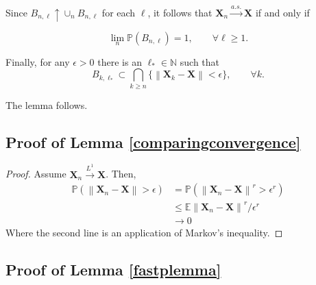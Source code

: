\documentclass[11pt] {article}
\newcommand{\norm}[1]{\left\lVert#1\right\rVert}
\newcommand{\Prob}{\mathbb{P}}
\newcommand{\X}{\pmb{X}}
\newcommand{\Expectation}{\mathbb{E}}
\newcommand{\convas}{\overset{a.s.}{\longrightarrow}}
\newcommand{\naturals}{\mathbb{N}}
\begin{document}
Since $B_{n, \ell} \uparrow \cup_nB_{n,\ell}$ for each $\ell$, it follows that $\X_n\convas\X$ if and only if

\begin{equation*}
\lim_n \Prob(B_{n,\ell}) = 1, \qquad  \forall \ell \geq 1.
\end{equation*}

Finally, for any $\epsilon > 0 $ there is an $\ell_* \in \naturals $ such that 
\begin{equation*}
B_{k,\ell_*} \subset \bigcap_{k \geq n} \{\norm{\X_k - \X}< \epsilon\}, \qquad \forall k.
\end{equation*}

The lemma follows. 

\subsection*{Proof of Lemma \ref{comparingconvergence}}
\begin{proof}
	Assume $\X_n \overset{L^1}{\longrightarrow} \X$. Then,
	\begin{align*}
	\mathbb{P}(\norm{\X_n-\X}>\epsilon )&= \mathbb{P}(\norm{\X_n-\X}^r>\epsilon^r ) \\
	&\leq \Expectation\norm{\X_n-\X}^r/\epsilon^r \\
	& \to 0
	\end{align*}
Where the second line is an application of Markov's inequality.

\end{proof}

\subsection*{Proof of Lemma \ref{fastplemma}}
\end{document}
